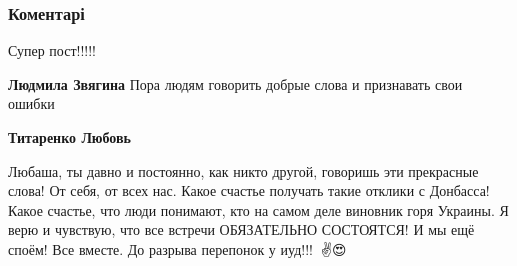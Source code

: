  
 
 
 
 
\subsubsection{Коментарі}
\label{sec:01_08_2021.fb.titarenko_lubov.1.donbass_mir.cmt}

\begin{itemize}
 
Супер пост!!!!!

\begin{itemize}
 
\textbf{Людмила Звягина} Пора людям говорить добрые слова и признавать свои ошибки

 
\textbf{Титаренко Любовь} 

Любаша, ты давно и постоянно, как никто другой, говоришь эти прекрасные слова!
От себя, от всех нас. Какое счастье получать такие отклики с Донбасса! Какое
счастье, что люди понимают, кто на самом деле виновник горя Украины. Я верю и
чувствую, что все встречи ОБЯЗАТЕЛЬНО СОСТОЯТСЯ! И мы ещё споём! Все вместе. До
разрыва перепонок у иуд!!!👊✊✌️😍


 

\end{itemize}
\end{itemize}
